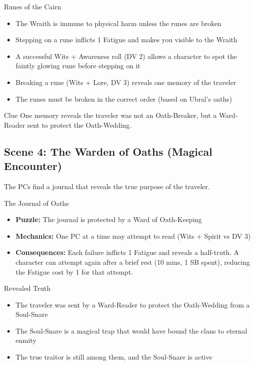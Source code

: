 \documentclass[11pt]{article}
\begin{document}
\begin{puzzlebox}{Runes of the Cairn}
\begin{itemize}
    \item The Wraith is immune to physical harm unless the runes are broken
    \item Stepping on a rune inflicts 1 Fatigue and makes you visible to the Wraith
    \item A successful Wits + Awareness roll (DV 2) allows a character to spot the faintly glowing rune before stepping on it
    \item Breaking a rune (Wits + Lore, DV 3) reveals one memory of the traveler
    \item The runes must be broken in the correct order (based on Ubral's oaths)
\end{itemize}
\end{puzzlebox}

\begin{cluebox}{Clue}
One memory reveals the traveler was not an Oath-Breaker, but a Ward-Reader sent to protect the Oath-Wedding.
\end{cluebox}

\subsection*{Scene 4: The Warden of Oaths (Magical Encounter)}
The PCs find a journal that reveals the true purpose of the traveler.

\begin{puzzlebox}{The Journal of Oaths}
\begin{itemize}
    \item \textbf{Puzzle:} The journal is protected by a Ward of Oath-Keeping
    \item \textbf{Mechanics:} One PC at a time may attempt to read (Wits + Spirit vs DV 3)
    \item \textbf{Consequences:} Each failure inflicts 1 Fatigue and reveals a half-truth. A character can attempt again after a brief rest (10 mins, 1 SB spent), reducing the Fatigue cost by 1 for that attempt.
\end{itemize}
\end{puzzlebox}

\begin{cluebox}{Revealed Truth}
\begin{itemize}
    \item The traveler was sent by a Ward-Reader to protect the Oath-Wedding from a Soul-Snare
    \item The Soul-Snare is a magical trap that would have bound the clans to eternal enmity
    \item The true traitor is still among them, and the Soul-Snare is active
\end{itemize}
\end{cluebox}
\end{document}
